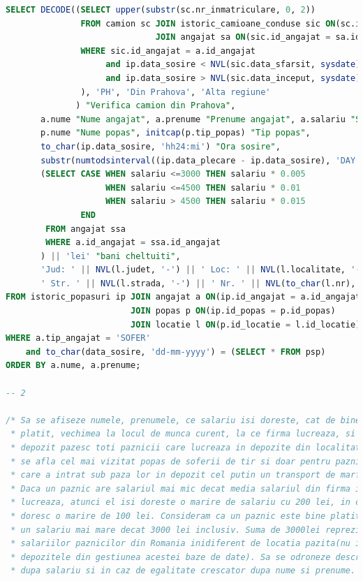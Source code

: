 \documentclass[12pt, a4paper]{article}
\begin{document}
\begin{lstlisting}[language=SQL]
SELECT DECODE((SELECT upper(substr(sc.nr_inmatriculare, 0, 2))
               FROM camion sc JOIN istoric_camioane_conduse sic ON(sc.id_camion = sic.id_camion)
                              JOIN angajat sa ON(sic.id_angajat = sa.id_angajat)
               WHERE sic.id_angajat = a.id_angajat
                    and ip.data_sosire < NVL(sic.data_sfarsit, sysdate)
                    and ip.data_sosire > NVL(sic.data_inceput, sysdate)
               ), 'PH', 'Din Prahova', 'Alta regiune'
              ) "Verifica camion din Prahova",
       a.nume "Nume angajat", a.prenume "Prenume angajat", a.salariu "Salariu",
       p.nume "Nume popas", initcap(p.tip_popas) "Tip popas",
       to_char(ip.data_sosire, 'hh24:mi') "Ora sosire",
       substr(numtodsinterval((ip.data_plecare - ip.data_sosire), 'DAY'), 12, 5) "Durata",
       (SELECT CASE WHEN salariu <=3000 THEN salariu * 0.005
                    WHEN salariu <=4500 THEN salariu * 0.01
                    WHEN salariu > 4500 THEN salariu * 0.015
               END
        FROM angajat ssa
        WHERE a.id_angajat = ssa.id_angajat
       ) || 'lei' "bani cheltuiti",
       'Jud: ' || NVL(l.judet, '-') || ' Loc: ' || NVL(l.localitate, '-') ||
       ' Str. ' || NVL(l.strada, '-') || ' Nr. ' || NVL(to_char(l.nr), '-') "Locatie popas"
FROM istoric_popasuri ip JOIN angajat a ON(ip.id_angajat = a.id_angajat)
                         JOIN popas p ON(ip.id_popas = p.id_popas)
                         JOIN locatie l ON(p.id_locatie = l.id_locatie)
WHERE a.tip_angajat = 'SOFER'
    and to_char(data_sosire, 'dd-mm-yyyy') = (SELECT * FROM psp)
ORDER BY a.nume, a.prenume;

-- 2

/* Sa se afiseze numele, prenumele, ce salariu isi doreste, cat de bine este
 * platit, vechimea la locul de munca curent, la ce firma lucreaza, si ce
 * depozit pazesc toti paznicii care lucreaza in depozite din localitatea in care
 * se afla cel mai vizitat popas de soferii de tir si doar pentru paznicii pentru
 * care a intrat sub paza lor in depozit cel putin un transport de marfa.
 * Daca un paznic are salariul mai mic decat media salariul din firma in care
 * lucreaza, atunci el isi doreste o marire de salariu cu 200 lei, in caz contra
 * doresc o marire de 100 lei. Consideram ca un paznic este bine platit daca are
 * un salariu mai mare decat 3000 lei inclusiv. Suma de 3000lei reprezinta media
 * salariilor paznicilor din Romania inidiferent de locatia pazita(nu intra doar
 * depozitele din gestiunea acestei baze de date). Sa se odroneze descrescator
 * dupa salariu si in caz de egalitate crescator dupa nume si prenume. */


\end{lstlisting}
\end{document}

